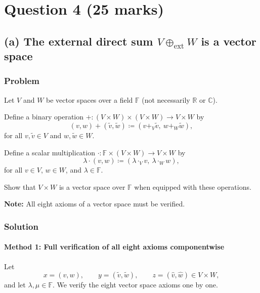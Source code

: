\documentclass[12pt]{article}
\begin{document}
\newpage
\section{Question 4 \hfill (25 marks)}

\subsection{(a) The external direct sum \(V\oplus_{\mathrm{ext}}W\) is a vector space}
\subsubsection{Problem}
Let \(V\) and \(W\) be vector spaces over a field \(\mathbb F\) (not necessarily \(\mathbb R\) or \(\mathbb C\)).

\medskip
Define a binary operation \(+:(V\times W)\times (V\times W)\to V\times W\) by
\[
(v,w)+(\tilde v,\tilde w)\coloneqq (v+_V \tilde v,\ w+_W \tilde w),
\]
for all \(v,\tilde v\in V\) and \(w,\tilde w\in W\).

Define a scalar multiplication \(\cdot:\mathbb F\times (V\times W)\to V\times W\) by
\[
\lambda\cdot (v,w)\coloneqq (\lambda\cdot_V v,\ \lambda\cdot_W w),
\]
for all \(v\in V\), \(w\in W\), and \(\lambda\in\mathbb F\).

\medskip
Show that \(V\times W\) is a vector space over \(\mathbb F\) when equipped with these operations.

\medskip
\textbf{Note:} All eight axioms of a vector space must be verified.

\vspace{2cm}
\subsubsection{Solution}

\paragraph{Method 1: Full verification of all eight axioms componentwise}
Let
\[
x=(v,w),\qquad y=(\tilde v,\tilde w),\qquad z=(\hat v,\hat w)\in V\times W,
\]
and let \(\lambda,\mu\in\mathbb F\). We verify the eight vector space axioms one by one.
\end{document}
